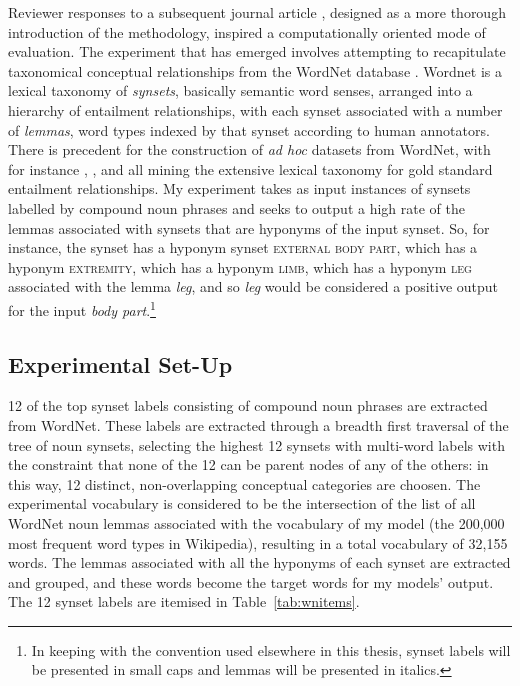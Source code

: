 Reviewer responses to a subsequent journal article \citep{McGregorEA2015c}, designed as a more thorough introduction of the methodology, inspired a computationally oriented mode of evaluation.  The experiment that has emerged involves attempting to recapitulate taxonomical conceptual relationships from the WordNet database \citep{Fellbaum1998}.  Wordnet is a lexical taxonomy of \emph{synsets}, basically semantic word senses, arranged into a hierarchy of entailment relationships, with each synset associated with a number of \emph{lemmas}, word types indexed by that synset according to human annotators.  There is precedent for the construction of \emph{ad hoc} datasets from WordNet, with for instance \cite{BaroniEA2012}, \cite{RiedlEA2013}, and \cite{MelamudEA2014} all mining the extensive lexical taxonomy for gold standard entailment relationships.  My experiment takes as input instances of synsets labelled by compound noun phrases and seeks to output a high rate of the lemmas associated with synsets that are hyponyms of the input synset.  So, for instance, the synset  has a hyponym synset \textsc{external body part}, which has a hyponym \textsc{extremity}, which has a hyponym \textsc{limb}, which has a hyponym \textsc{leg} associated with the lemma \emph{leg}, and so \emph{leg} would be considered a positive output for the input \emph{body part}.\footnote{In keeping with the convention used elsewhere in this thesis, synset labels will be presented in small caps and lemmas will be presented in italics.}

\subsection{Experimental Set-Up}
12 of the top synset labels consisting of compound noun phrases are extracted from WordNet.  These labels are extracted through a breadth first traversal of the tree of noun synsets, selecting the highest 12 synsets with multi-word labels with the constraint that none of the 12 can be parent nodes of any of the others: in this way, 12 distinct, non-overlapping conceptual categories are choosen.  The experimental vocabulary is considered to be the intersection of the list of all WordNet noun lemmas associated with the vocabulary of my model (the 200,000 most frequent word types in Wikipedia), resulting in a total vocabulary of 32,155 words.  The lemmas associated with all the hyponyms of each synset are extracted and grouped, and these words become the target words for my models' output.  The 12 synset labels are itemised in Table~\ref{tab:wnitems}.

